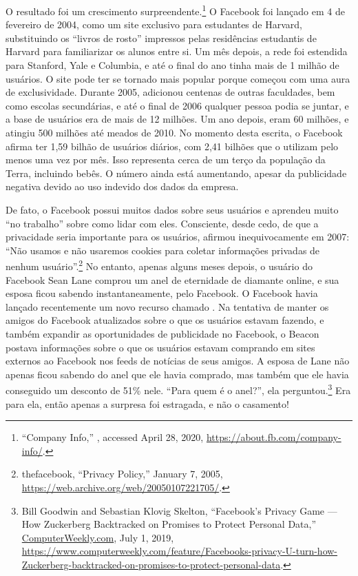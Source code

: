 O resultado foi um crescimento surpreendente.\footnote{``Company Info,'' ,
accessed April 28, 2020, \url{https://about.fb.com/company-info/}.} O Facebook foi lançado em 4
de fevereiro de 2004, como um site exclusivo para estudantes de Harvard, substituindo os ``livros
de rosto'' impressos pelas residências estudantis de Harvard para familiarizar os alunos entre si.
Um mês depois, a rede foi estendida para Stanford, Yale e Columbia, e até o final do ano tinha
mais de 1 milhão de usuários. O site pode ter se tornado mais popular porque começou com uma aura
de exclusividade. Durante 2005, adicionou centenas de outras faculdades, bem como escolas
secundárias, e até o final de 2006 qualquer pessoa podia se juntar, e a base de usuários era de
mais de 12 milhões. Um ano depois, eram 60 milhões, e atingiu 500 milhões até meados de 2010. No
momento desta escrita, o Facebook afirma ter 1,59 bilhão de usuários diários, com 2,41 bilhões que
o utilizam pelo menos uma vez por mês. Isso representa cerca de um terço da população da Terra,
incluindo bebês. O número ainda está aumentando, apesar da publicidade negativa devido ao uso
indevido dos dados da empresa.

De fato, o Facebook possui muitos dados sobre seus usuários e aprendeu muito ``no trabalho'' sobre
como lidar com eles. Consciente, desde cedo, de que a privacidade seria importante para os usuários,
afirmou inequivocamente em 2007: ``Não usamos e não usaremos cookies para coletar informações
privadas de nenhum usuário''.\footnote{thefacebook, ``Privacy Policy,'' January 7, 2005,
\url{https://web.archive.org/web/20050107221705/}.} No entanto, apenas alguns meses depois, o
usuário do Facebook Sean Lane comprou um anel de eternidade de diamante online, e sua esposa ficou
sabendo instantaneamente, pelo Facebook. O Facebook havia lançado recentemente um novo recurso
chamado . Na tentativa de manter os amigos do Facebook atualizados sobre o que os
usuários estavam fazendo, e também expandir as oportunidades de publicidade no Facebook, o Beacon
postava informações sobre o que os usuários estavam comprando em sites externos ao Facebook nos
feeds de notícias de seus amigos. A esposa de Lane não apenas ficou sabendo do anel que ele havia
comprado, mas também que ele havia conseguido um desconto de 51\% nele. ``Para quem é o anel?'',
ela perguntou.\footnote{Bill Goodwin and Sebastian Klovig Skelton, ``Facebook’s Privacy Game ---
How Zuckerberg Backtracked on Promises to Protect Personal Data,'' \url{ComputerWeekly.com}, July
1, 2019,
\url{https://www.computerweekly.com/feature/Facebooks-privacy-U-turn-how-Zuckerberg-backtracked-on-promises-to-protect-personal-data}.}
Era para ela, então apenas a surpresa foi estragada, e não o casamento!

